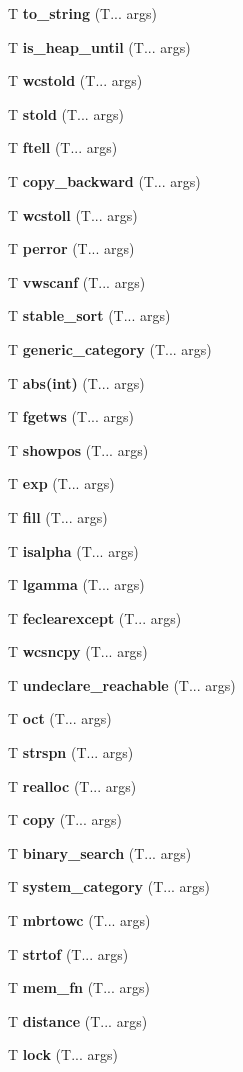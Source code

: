 \begin{DoxyCompactItemize}
T \textbf{ to\+\_\+string} (T... args)
\item 
T \textbf{ is\+\_\+heap\+\_\+until} (T... args)
\item 
T \textbf{ wcstold} (T... args)
\item 
T \textbf{ stold} (T... args)
\item 
T \textbf{ ftell} (T... args)
\item 
T \textbf{ copy\+\_\+backward} (T... args)
\item 
T \textbf{ wcstoll} (T... args)
\item 
T \textbf{ perror} (T... args)
\item 
T \textbf{ vwscanf} (T... args)
\item 
T \textbf{ stable\+\_\+sort} (T... args)
\item 
T \textbf{ generic\+\_\+category} (T... args)
\item 
T \textbf{ abs(int)} (T... args)
\item 
T \textbf{ fgetws} (T... args)
\item 
T \textbf{ showpos} (T... args)
\item 
T \textbf{ exp} (T... args)
\item 
T \textbf{ fill} (T... args)
\item 
T \textbf{ isalpha} (T... args)
\item 
T \textbf{ lgamma} (T... args)
\item 
T \textbf{ feclearexcept} (T... args)
\item 
T \textbf{ wcsncpy} (T... args)
\item 
T \textbf{ undeclare\+\_\+reachable} (T... args)
\item 
T \textbf{ oct} (T... args)
\item 
T \textbf{ strspn} (T... args)
\item 
T \textbf{ realloc} (T... args)
\item 
T \textbf{ copy} (T... args)
\item 
T \textbf{ binary\+\_\+search} (T... args)
\item 
T \textbf{ system\+\_\+category} (T... args)
\item 
T \textbf{ mbrtowc} (T... args)
\item 
T \textbf{ strtof} (T... args)
\item 
T \textbf{ mem\+\_\+fn} (T... args)
\item 
T \textbf{ distance} (T... args)
\item 
T \textbf{ lock} (T... args)
\item 

\end{DoxyCompactItemize}
